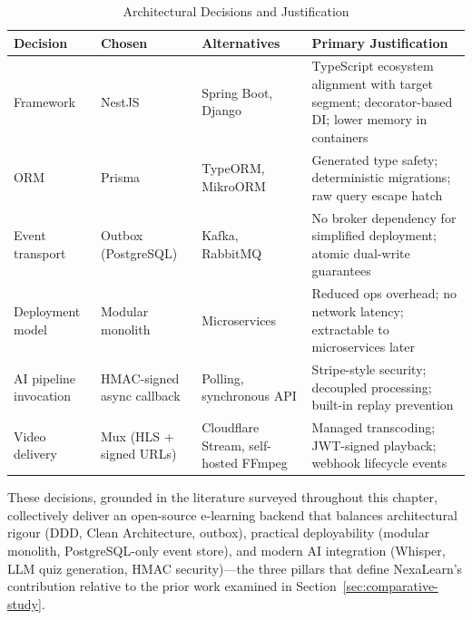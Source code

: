 \begin{table}[H]
  \centering
  \caption{Architectural Decisions and Justification}
  \label{tab:arch-decisions}
  \small
  \begin{tabular}{@{}p{3.0cm} p{2.5cm} p{2.5cm} p{4.5cm}@{}}
    \toprule
    \textbf{Decision} &
    \textbf{Chosen} &
    \textbf{Alternatives} &
    \textbf{Primary Justification} \\
    \midrule
    Framework &
    NestJS &
    Spring Boot, Django &
    TypeScript ecosystem alignment with target segment; decorator-based DI; lower memory in containers \\
    \addlinespace
    ORM &
    Prisma &
    TypeORM, MikroORM &
    Generated type safety; deterministic migrations; raw query escape hatch \\
    \addlinespace
    Event transport &
    Outbox (PostgreSQL) &
    Kafka, RabbitMQ &
    No broker dependency for simplified deployment; atomic dual-write guarantees \\
    \addlinespace
    Deployment model &
    Modular monolith &
    Microservices &
    Reduced ops overhead; no network latency; extractable to microservices later \\
    \addlinespace
    AI pipeline invocation &
    HMAC-signed async callback &
    Polling, synchronous API &
    Stripe-style security; decoupled processing; built-in replay prevention \\
    \addlinespace
    Video delivery &
    Mux (HLS + signed URLs) &
    Cloudflare Stream, self-hosted FFmpeg &
    Managed transcoding; JWT-signed playback; webhook lifecycle events \\
    \bottomrule
  \end{tabular}
\end{table}

These decisions, grounded in the literature surveyed throughout this chapter, collectively deliver an open-source e-learning backend that balances architectural rigour (DDD, Clean Architecture, outbox), practical deployability (modular monolith, PostgreSQL-only event store), and modern AI integration (Whisper, LLM quiz generation, HMAC security)---the three pillars that define NexaLearn's contribution relative to the prior work examined in Section~\ref{sec:comparative-study}.
